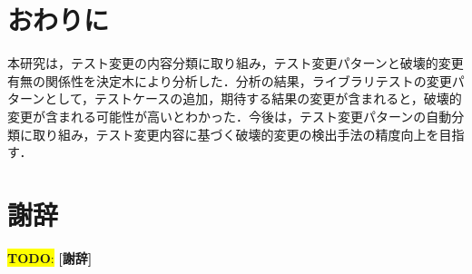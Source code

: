\documentclass[uplatex,dvipdfmx,a4paper,twocolumn,base=11pt,jbase=11pt,ja=standard]{bxjsarticle}  %
\newcommand{\todo}[1]{\colorbox{yellow}{{\bf TODO}:}{\color{red} {\textbf{[#1]}}}}
\begin{document}
\section{おわりに}

本研究は，テスト変更の内容分類に取り組み，テスト変更パターンと破壊的変更有無の関係性を決定木により分析した．分析の結果，ライブラリテストの変更パターンとして，テストケースの追加，期待する結果の変更が含まれると，破壊的変更が含まれる可能性が高いとわかった．今後は，テスト変更パターンの自動分類に取り組み，テスト変更内容に基づく破壊的変更の検出手法の精度向上を目指す．

\section*{謝辞}

\todo{謝辞}

 

\end{document}
